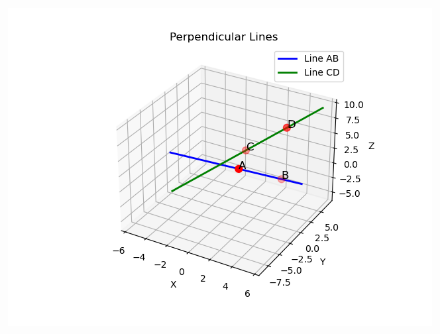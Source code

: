 \documentclass[journal]{IEEEtran}
\begin{document}
\begin{figure}
    \centering
    \includegraphics[width=\linewidth]{figs/points.png}
    \caption{}
\end{figure}
\end{document}
